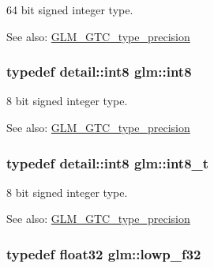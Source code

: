 64 bit signed integer type. \begin{Desc}
\item[See also:]\hyperlink{group__gtc__type__precision}{GLM\_\-GTC\_\-type\_\-precision} \end{Desc}
\hypertarget{group__gtc__type__precision_g96254f9c1c4506fc8eb5cf3301ce8565}{
\subsubsection[int8]{\setlength{\rightskip}{0pt plus 5cm}typedef detail::int8 {\bf glm::int8}}}
\label{group__gtc__type__precision_g96254f9c1c4506fc8eb5cf3301ce8565}


8 bit signed integer type. \begin{Desc}
\item[See also:]\hyperlink{group__gtc__type__precision}{GLM\_\-GTC\_\-type\_\-precision} \end{Desc}
\hypertarget{group__gtc__type__precision_g673898d450b2a91186f3c4f40c5f8633}{
\subsubsection[int8\_\-t]{\setlength{\rightskip}{0pt plus 5cm}typedef detail::int8 {\bf glm::int8\_\-t}}}
\label{group__gtc__type__precision_g673898d450b2a91186f3c4f40c5f8633}


8 bit signed integer type. \begin{Desc}
\item[See also:]\hyperlink{group__gtc__type__precision}{GLM\_\-GTC\_\-type\_\-precision} \end{Desc}
\hypertarget{group__gtc__type__precision_g1b9734de4b4429dc26b1454a2a399b05}{
\subsubsection[lowp\_\-f32]{\setlength{\rightskip}{0pt plus 5cm}typedef float32 {\bf glm::lowp\_\-f32}}}
\label{group__gtc__type__precision_g1b9734de4b4429dc26b1454a2a399b05}



